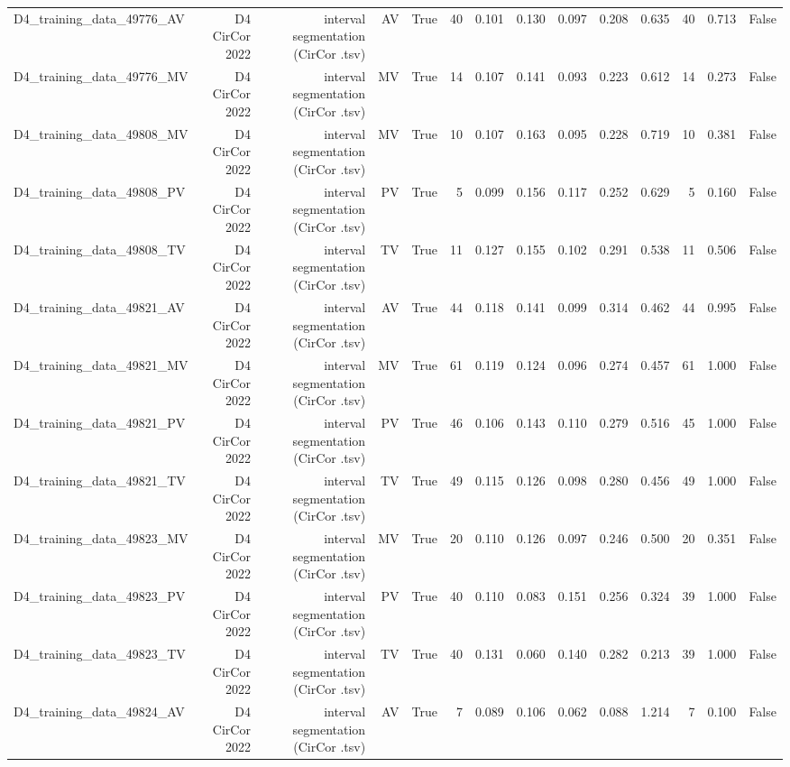 \begin{table}[htbp]
\begin{tabular}{lrrrrrrrrrrrrr}
    D4\_training\_data\_49776\_AV & D4 CirCor 2022 & interval segmentation (CirCor .tsv) & AV & True & 40 & 0.101 & 0.130 & 0.097 & 0.208 & 0.635 & 40 & 0.713 & False \\
    D4\_training\_data\_49776\_MV & D4 CirCor 2022 & interval segmentation (CirCor .tsv) & MV & True & 14 & 0.107 & 0.141 & 0.093 & 0.223 & 0.612 & 14 & 0.273 & False \\
    D4\_training\_data\_49808\_MV & D4 CirCor 2022 & interval segmentation (CirCor .tsv) & MV & True & 10 & 0.107 & 0.163 & 0.095 & 0.228 & 0.719 & 10 & 0.381 & False \\
    D4\_training\_data\_49808\_PV & D4 CirCor 2022 & interval segmentation (CirCor .tsv) & PV & True & 5 & 0.099 & 0.156 & 0.117 & 0.252 & 0.629 & 5 & 0.160 & False \\
    D4\_training\_data\_49808\_TV & D4 CirCor 2022 & interval segmentation (CirCor .tsv) & TV & True & 11 & 0.127 & 0.155 & 0.102 & 0.291 & 0.538 & 11 & 0.506 & False \\
    D4\_training\_data\_49821\_AV & D4 CirCor 2022 & interval segmentation (CirCor .tsv) & AV & True & 44 & 0.118 & 0.141 & 0.099 & 0.314 & 0.462 & 44 & 0.995 & False \\
    D4\_training\_data\_49821\_MV & D4 CirCor 2022 & interval segmentation (CirCor .tsv) & MV & True & 61 & 0.119 & 0.124 & 0.096 & 0.274 & 0.457 & 61 & 1.000 & False \\
    D4\_training\_data\_49821\_PV & D4 CirCor 2022 & interval segmentation (CirCor .tsv) & PV & True & 46 & 0.106 & 0.143 & 0.110 & 0.279 & 0.516 & 45 & 1.000 & False \\
    D4\_training\_data\_49821\_TV & D4 CirCor 2022 & interval segmentation (CirCor .tsv) & TV & True & 49 & 0.115 & 0.126 & 0.098 & 0.280 & 0.456 & 49 & 1.000 & False \\
    D4\_training\_data\_49823\_MV & D4 CirCor 2022 & interval segmentation (CirCor .tsv) & MV & True & 20 & 0.110 & 0.126 & 0.097 & 0.246 & 0.500 & 20 & 0.351 & False \\
    D4\_training\_data\_49823\_PV & D4 CirCor 2022 & interval segmentation (CirCor .tsv) & PV & True & 40 & 0.110 & 0.083 & 0.151 & 0.256 & 0.324 & 39 & 1.000 & False \\
    D4\_training\_data\_49823\_TV & D4 CirCor 2022 & interval segmentation (CirCor .tsv) & TV & True & 40 & 0.131 & 0.060 & 0.140 & 0.282 & 0.213 & 39 & 1.000 & False \\
    D4\_training\_data\_49824\_AV & D4 CirCor 2022 & interval segmentation (CirCor .tsv) & AV & True & 7 & 0.089 & 0.106 & 0.062 & 0.088 & 1.214 & 7 & 0.100 & False \\

\end{tabular}
\end{table}
